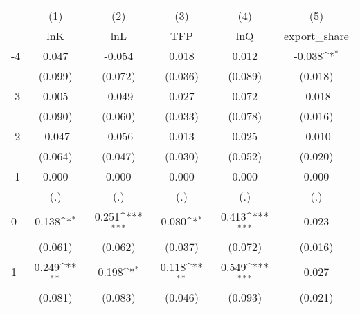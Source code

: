 {
\def\sym#1{\ifmmode^{#1}\else\(^{#1}\)\fi}
\begin{tabular}{l*{5}{c}}
\hline\hline
                    &\multicolumn{1}{c}{(1)}&\multicolumn{1}{c}{(2)}&\multicolumn{1}{c}{(3)}&\multicolumn{1}{c}{(4)}&\multicolumn{1}{c}{(5)}\\
                    &\multicolumn{1}{c}{lnK}&\multicolumn{1}{c}{lnL}&\multicolumn{1}{c}{TFP}&\multicolumn{1}{c}{lnQ}&\multicolumn{1}{c}{export\_share}\\
\hline
-4                  &       0.047         &      -0.054         &       0.018         &       0.012         &      -0.038\sym{*}  \\
                    &     (0.099)         &     (0.072)         &     (0.036)         &     (0.089)         &     (0.018)         \\
[1em]
-3                  &       0.005         &      -0.049         &       0.027         &       0.072         &      -0.018         \\
                    &     (0.090)         &     (0.060)         &     (0.033)         &     (0.078)         &     (0.016)         \\
[1em]
-2                  &      -0.047         &      -0.056         &       0.013         &       0.025         &      -0.010         \\
                    &     (0.064)         &     (0.047)         &     (0.030)         &     (0.052)         &     (0.020)         \\
[1em]
-1                  &       0.000         &       0.000         &       0.000         &       0.000         &       0.000         \\
                    &         (.)         &         (.)         &         (.)         &         (.)         &         (.)         \\
[1em]
0                   &       0.138\sym{*}  &       0.251\sym{***}&       0.080\sym{*}  &       0.413\sym{***}&       0.023         \\
                    &     (0.061)         &     (0.062)         &     (0.037)         &     (0.072)         &     (0.016)         \\
[1em]
1                   &       0.249\sym{**} &       0.198\sym{*}  &       0.118\sym{**} &       0.549\sym{***}&       0.027         \\
                    &     (0.081)         &     (0.083)         &     (0.046)         &     (0.093)         &     (0.021)         \\

\end{tabular}}
